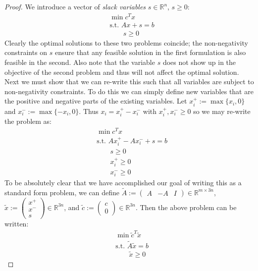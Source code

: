 \documentclass[12pt]{article}
\newcommand{\R}{\mathcal{R}}
\def\R{\mathbb{R}}
\begin{document}
\begin{proof}
We introduce a vector of \textit{slack variables} $s \in \R^n$, $s \geq 0$: 
\begin{align*}
&\min c^T x \\
&\text{s.t. } Ax + s = b \\
&\;\;\;\;\;\;\; s \geq 0
\end{align*}
Clearly the optimal solutions to these two problems coincide; the non-negativity constraints on $s$ ensure that any feasible solution in the first 
formulation is also feasible in the second. Also note that the variable $s$ does not show up in the objective of the second problem and thus will
not affect the optimal solution. Next we must show that we can re-write this such that all variables are subject to non-negativity constraints. 
To do this we can simply define new variables that are the positive and negative parts of the existing variables. Let 
$x_i^+ := \max\{x_i, 0\}$ and $x_i^- := \max\{-x_i, 0\}$. Thus $x_i = x_i^+ - x_i^-$ with $x_i^+, x_i^- \geq 0$ so we may re-write the problem as: 
\begin{align*}
&\min c^T x \\
&\text{s.t. } Ax_i^+ - Ax_i^- + s = b \\
&\;\;\;\;\;\;\; s \geq 0 \\
&\;\;\;\;\;\;\; x_i^+ \geq 0 \\
&\;\;\;\;\;\;\; x_i^- \geq 0
\end{align*}
To be absolutely clear that we have accomplished our goal of writing this as a standard form problem, we can define $\tilde{A} := \begin{pmatrix} A & -A & I \end{pmatrix} \in \R^{m \times 3n}$, 
$\tilde{x} := \begin{pmatrix} x^+ \\ x^- \\ s \end{pmatrix} \in \R^{3n}$, and $\tilde{c} := \begin{pmatrix} c \\ 0 \end{pmatrix} \in \R^{3n}$. Then the above problem can be written: 
\begin{align*}
&\min \tilde{c}^T \tilde{x} \\
&\text{s.t. } \tilde{A}\tilde{x} = b \\
&\;\;\;\;\;\;\; \tilde{x} \geq 0
\end{align*}

\end{proof}
\end{document}
